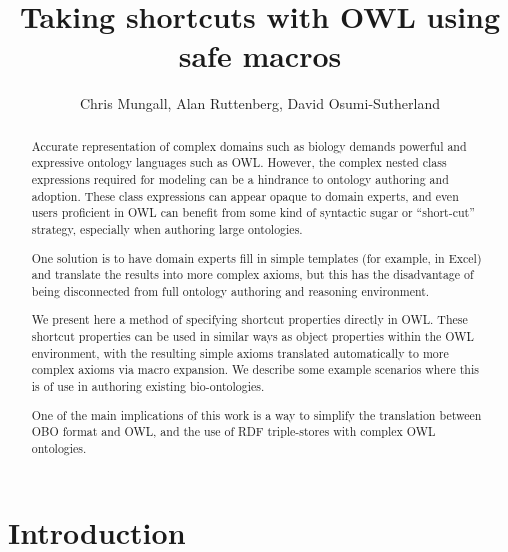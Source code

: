 \documentclass{llncs}
\begin{document}
%
\frontmatter          %

\title{Taking shortcuts with OWL using safe macros}

\author{Chris Mungall, Alan Ruttenberg, David Osumi-Sutherland}


\maketitle              %

\begin{abstract}

Accurate representation of complex domains such as biology demands
powerful and expressive ontology languages such as OWL. However, the
complex nested class expressions required for modeling can be a
hindrance to ontology authoring and adoption. These class expressions
can appear opaque to domain experts, and even users proficient in OWL
can benefit from some kind of syntactic sugar or ``short-cut''
strategy, especially when authoring large ontologies.

One solution is to have domain experts fill in simple templates (for
example, in Excel) and translate the results into more complex axioms,
but this has the disadvantage of being disconnected from full ontology
authoring and reasoning environment.

We present here a method of specifying shortcut properties directly in
OWL. These shortcut properties can be used in similar ways as object
properties within the OWL environment, with the resulting simple
axioms translated automatically to more complex axioms via macro
expansion. We describe some example scenarios where this is of use in
authoring existing bio-ontologies.

One of the main implications of this work is a way to simplify the
translation between OBO format and OWL, and the use of RDF
triple-stores with complex OWL ontologies.

\end{abstract}

\section{Introduction}
\end{document}
